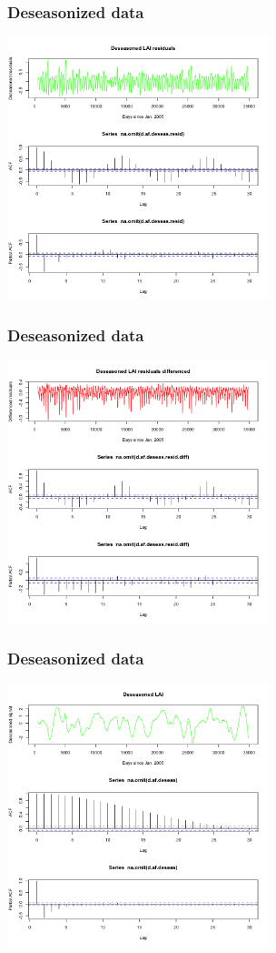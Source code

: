 \documentclass{beamer}
\begin{document}
\begin{frame}
    \frametitle{Deseasonized data}
    \includegraphics[height=3in]{../img/deseasonalization_resid.png}
\end{frame}

\begin{frame}
    \frametitle{Deseasonized data}
    \includegraphics[height=3in]{../img/deseasonalization_resid_difference.png}
\end{frame}

\begin{frame}
    \frametitle{Deseasonized data}
    \includegraphics[height=3in]{../img/deseasonalization.png}
\end{frame}
\end{document}
